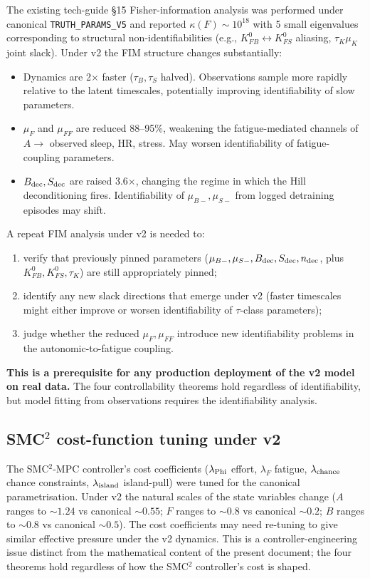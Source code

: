 \documentclass[11pt,a4paper]{article}
\theoremstyle{definition}
\begin{document}
The existing tech-guide §15 Fisher-information analysis was performed under canonical \texttt{TRUTH\_PARAMS\_V5} and reported $\kappa(F) \sim 10^{18}$ with 5 small eigenvalues corresponding to structural non-identifiabilities (e.g., $K_{FB}^0 \leftrightarrow K_{FS}^0$ aliasing, $\tau_K \mu_K$ joint slack). Under v2 the FIM structure changes substantially:

\begin{itemize}
  \item Dynamics are 2× faster ($\tau_B, \tau_S$ halved). Observations sample more rapidly relative to the latent timescales, potentially improving identifiability of slow parameters.
  \item $\mu_F$ and $\mu_{FF}$ are reduced 88--95\%, weakening the fatigue-mediated channels of $A \to$ observed sleep, HR, stress. May worsen identifiability of fatigue-coupling parameters.
  \item $B_{\rm dec}, S_{\rm dec}$ are raised 3.6×, changing the regime in which the Hill deconditioning fires. Identifiability of $\mu_{B-}, \mu_{S-}$ from logged detraining episodes may shift.
\end{itemize}

A repeat FIM analysis under v2 is needed to:
\begin{enumerate}
  \item[(a)] verify that previously pinned parameters ($\mu_{B-}, \mu_{S-}, B_{\rm dec}, S_{\rm dec}, n_{\rm dec}$, plus $K_{FB}^0, K_{FS}^0, \tau_K$) are still appropriately pinned;
  \item[(b)] identify any new slack directions that emerge under v2 (faster timescales might either improve or worsen identifiability of $\tau$-class parameters);
  \item[(c)] judge whether the reduced $\mu_F, \mu_{FF}$ introduce new identifiability problems in the autonomic-to-fatigue coupling.
\end{enumerate}

\textbf{This is a prerequisite for any production deployment of the v2 model on real data.} The four controllability theorems hold regardless of identifiability, but model fitting from observations requires the identifiability analysis.

\subsection{SMC$^2$ cost-function tuning under v2}

The SMC$^2$-MPC controller's cost coefficients ($\lambda_{\rm Phi}$ effort, $\lambda_F$ fatigue, $\lambda_{\rm chance}$ chance constraints, $\lambda_{\rm island}$ island-pull) were tuned for the canonical parametrisation. Under v2 the natural scales of the state variables change ($A$ ranges to $\sim 1.24$ vs canonical $\sim 0.55$; $F$ ranges to $\sim 0.8$ vs canonical $\sim 0.2$; $B$ ranges to $\sim 0.8$ vs canonical $\sim 0.5$). The cost coefficients may need re-tuning to give similar effective pressure under the v2 dynamics. This is a controller-engineering issue distinct from the mathematical content of the present document; the four theorems hold regardless of how the SMC$^2$ controller's cost is shaped.
\end{document}
